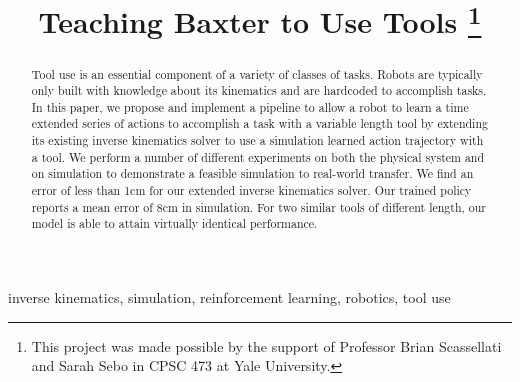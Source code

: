\documentclass[conference]{IEEEtran}
\begin{document}
\title{Teaching Baxter to Use Tools
\thanks{This project was made possible by the support of Professor Brian Scassellati and Sarah Sebo in CPSC 473 at Yale University.}
}

\author{
\and
{}
\and
{}
}

\maketitle

\begin{abstract}
 Tool use is an essential component of a variety of classes of tasks. Robots are typically only built with knowledge about its kinematics and are hardcoded to accomplish tasks. In this paper, we propose and implement a pipeline to allow a robot to learn a time extended series of actions to accomplish a task with a variable length tool by extending its existing inverse kinematics solver to use a simulation learned action trajectory with a tool. We perform a number of different experiments on both the physical system and on simulation to demonstrate a feasible simulation to real-world transfer. We find an error of less than 1cm for our extended inverse kinematics solver. Our trained policy reports a mean error of 8cm in simulation. For two similar tools of different length, our model is able to attain virtually identical performance.
 \end{abstract}

\begin{IEEEkeywords}
inverse kinematics, simulation, reinforcement learning, robotics, tool use
\end{IEEEkeywords}
\end{document}
